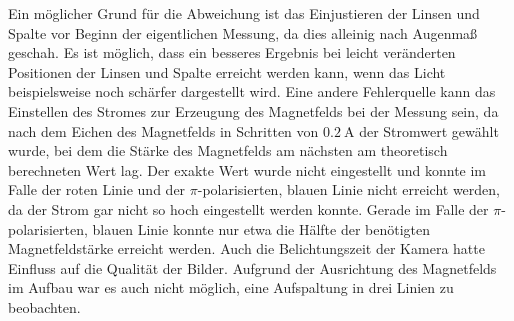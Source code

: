     Ein möglicher Grund für die Abweichung ist das Einjustieren der Linsen und Spalte vor Beginn der eigentlichen Messung,
    da dies alleinig nach Augenmaß geschah.
    Es ist möglich,
    dass ein besseres Ergebnis bei leicht veränderten Positionen der Linsen und Spalte erreicht werden kann,
    wenn das Licht beispielsweise noch schärfer dargestellt wird.
    Eine andere Fehlerquelle kann das Einstellen des Stromes zur Erzeugung des Magnetfelds bei der Messung sein,
    da nach dem Eichen des Magnetfelds in Schritten von $\SI{0.2}{\ampere}$ der Stromwert gewählt wurde,
    bei dem die Stärke des Magnetfelds am nächsten am theoretisch berechneten Wert lag.
    Der exakte Wert wurde nicht eingestellt
    und konnte im Falle der roten Linie und der $\pi$-polarisierten, blauen Linie nicht erreicht werden,
    da der Strom gar nicht so hoch eingestellt werden konnte.
    Gerade im Falle der $\pi$-polarisierten, blauen Linie konnte nur etwa die Hälfte der benötigten Magnetfeldstärke erreicht werden.
    Auch die Belichtungszeit der Kamera hatte Einfluss auf die Qualität der Bilder.
    Aufgrund der Ausrichtung des Magnetfelds im Aufbau war es auch nicht möglich,
    eine Aufspaltung in drei Linien zu beobachten.
